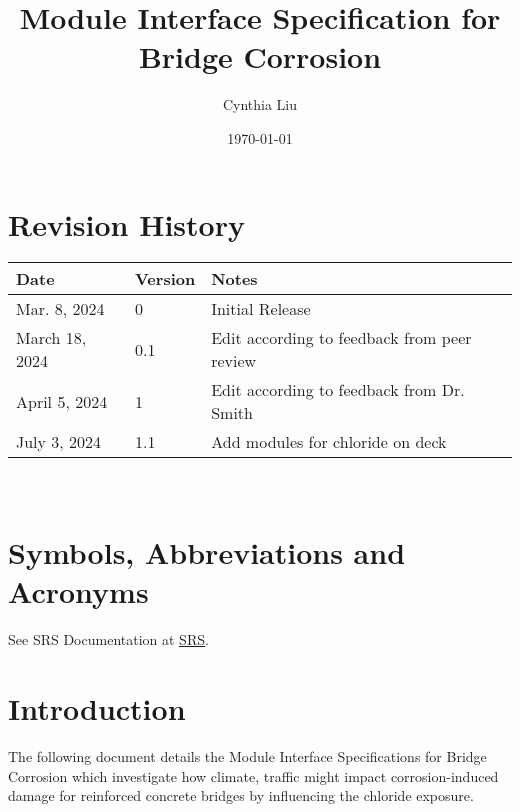 \documentclass[12pt, titlepage]{article}
\begin{document}
\title{Module Interface Specification for Bridge Corrosion}

\author{Cynthia Liu}

\date{\today}

\maketitle


\section{Revision History}

\begin{tabularx}{\textwidth}{p{3cm}p{2cm}X}
\toprule {\bf Date} & {\bf Version} & {\bf Notes}\\
\midrule
Mar. 8, 2024 & 0 & Initial Release\\
March 18, 2024 & 0.1 & Edit according to feedback from peer review \\
April 5, 2024 & 1 & Edit according to feedback from Dr. Smith\\
July 3, 2024 & 1.1 & Add modules for chloride on deck\\
\bottomrule
\end{tabularx}

~\newpage

\section{Symbols, Abbreviations and Acronyms}

See SRS Documentation at \href{https://github.com/CynthiaLiu0805/BridgeCorrosion/blob/main/docs/SRS/SRS.pdf}{SRS}.


\newpage

\tableofcontents

\newpage


\section{Introduction}

The following document details the Module Interface Specifications for Bridge Corrosion which investigate how climate, traffic might impact corrosion-induced
damage for reinforced concrete bridges by influencing the chloride exposure.
\end{document}
